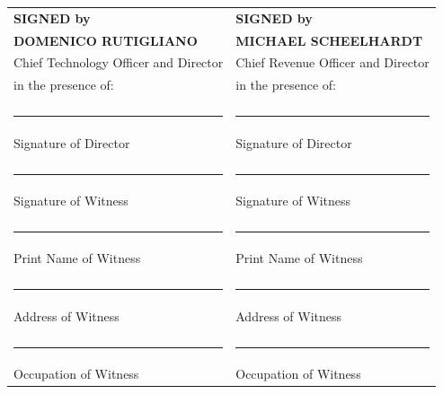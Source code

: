 \documentclass[12pt,a4paper]{article}
\begin{document}
\begin{tabular}{p{7cm}p{7cm}}
\textbf{SIGNED by} & \textbf{SIGNED by} \\
\textbf{DOMENICO RUTIGLIANO} & \textbf{MICHAEL SCHEELHARDT} \\
Chief Technology Officer and Director & Chief Revenue Officer and Director \\
in the presence of: & in the presence of: \\
\vspace{3cm} & \vspace{3cm} \\
\rule{6cm}{0.5pt} & \rule{6cm}{0.5pt} \\
Signature of Director & Signature of Director \\
\vspace{1cm} & \vspace{1cm} \\
\rule{6cm}{0.5pt} & \rule{6cm}{0.5pt} \\
Signature of Witness & Signature of Witness \\
\vspace{0.5cm} & \vspace{0.5cm} \\
\rule{6cm}{0.5pt} & \rule{6cm}{0.5pt} \\
Print Name of Witness & Print Name of Witness \\
\vspace{0.5cm} & \vspace{0.5cm} \\
\rule{6cm}{0.5pt} & \rule{6cm}{0.5pt} \\
Address of Witness & Address of Witness \\
\vspace{0.5cm} & \vspace{0.5cm} \\
\rule{6cm}{0.5pt} & \rule{6cm}{0.5pt} \\
Occupation of Witness & Occupation of Witness \\
\end{tabular}
\end{document}
